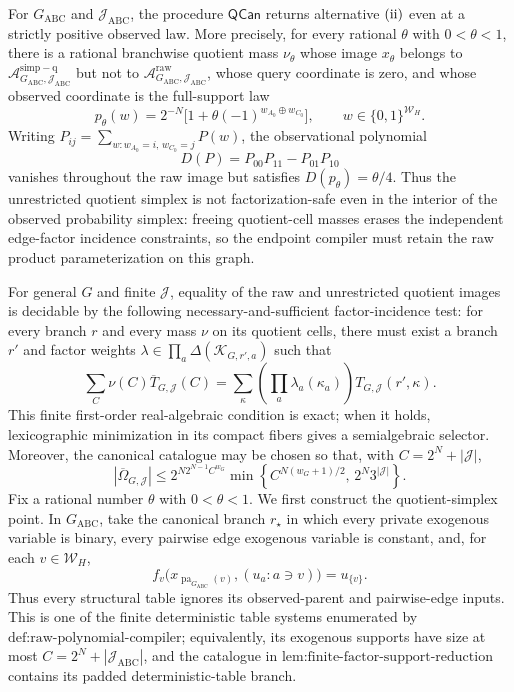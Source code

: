 For \(G_{\mathrm{ABC}}\) and \(\mathcal J_{\mathrm{ABC}}\), the procedure \(\mathsf{QCan}\) returns alternative \({\rm(ii)}\) even at a strictly positive observed law.  More precisely, for every rational \(\theta\) with \(0<\theta<1\), there is a rational branchwise quotient mass \(\nu_\theta\) whose image \(x_\theta\) belongs to \(\mathcal A_{G_{\mathrm{ABC}},\mathcal J_{\mathrm{ABC}}}^{\mathrm{simp-q}}\) but not to \(\mathcal A_{G_{\mathrm{ABC}},\mathcal J_{\mathrm{ABC}}}^{\mathrm{raw}}\), whose query coordinate is zero, and whose observed coordinate is the full-support law
\[
p_\theta(w)=2^{-N}\bigl[1+\theta(-1)^{w_{A_0}\oplus w_{C_0}}\bigr],
\qquad w\in\{0,1\}^{\mathcal W_H}.
\]
Writing \(P_{ij}=\sum_{w:w_{A_0}=i,\,w_{C_0}=j}P(w)\), the observational polynomial
\[
D(P)=P_{00}P_{11}-P_{01}P_{10}
\]
vanishes throughout the raw image but satisfies \(D(p_\theta)=\theta/4\).  Thus the unrestricted quotient simplex is not factorization-safe even in the interior of the observed probability simplex: freeing quotient-cell masses erases the independent edge-factor incidence constraints, so the endpoint compiler must retain the raw product parameterization on this graph.

For general \(G\) and finite \(\mathcal J\), equality of the raw and unrestricted quotient images is decidable by the following necessary-and-sufficient factor-incidence test: for every branch \(r\) and every mass \(\nu\) on its quotient cells, there must exist a branch \(r'\) and factor weights \(\lambda\in\prod_a\Delta(\mathcal K_{G,r',a})\) such that
\[
\sum_C\nu(C)\overline T_{G,\mathcal J}(C)
=\sum_\kappa\left(\prod_a\lambda_a(\kappa_a)\right)T_{G,\mathcal J}(r',\kappa).
\]
This finite first-order real-algebraic condition is exact; when it holds, lexicographic minimization in its compact fibers gives a semialgebraic selector.  Moreover, the canonical catalogue may be chosen so that, with \(C=2^N+|\mathcal J|\),
\[
|\overline\Omega_{G,\mathcal J}|
\le
2^{N2^{N-1}C^{w_G}}
\min\left\{C^{N(w_G+1)/2},\,2^N3^{|\mathcal J|}\right\}.
\]
Fix a rational number \(\theta\) with \(0<\theta<1\).  We first construct the quotient-simplex point.  In \(G_{\mathrm{ABC}}\), take the canonical branch \(r_\star\) in which every private exogenous variable is binary, every pairwise edge exogenous variable is constant, and, for each \(v\in\mathcal W_H\),
\[
f_v\bigl(x_{\operatorname{pa}_{G_{\mathrm{ABC}}}(v)},(u_a:a\ni v)\bigr)=u_{\{v\}}.
\tag{27}
\]
Thus every structural table ignores its observed-parent and pairwise-edge inputs.  This is one of the finite deterministic table systems enumerated by \(\text{def:raw-polynomial-compiler}\); equivalently, its exogenous supports have size at most \(C=2^N+|\mathcal J_{\mathrm{ABC}}|\), and the catalogue in \(\text{lem:finite-factor-support-reduction}\) contains its padded deterministic-table branch.

